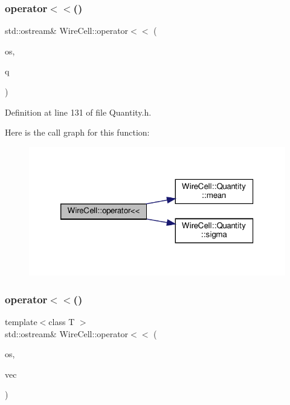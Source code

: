 \subsubsection{\texorpdfstring{operator$<$$<$()}{operator<<()}\hspace{0.1cm}{\footnotesize\ttfamily [5/6]}}
{\footnotesize\ttfamily std\+::ostream\& Wire\+Cell\+::operator$<$$<$ (\begin{DoxyParamCaption}\item[{std\+::ostream \&}]{os,  }\item[{const \hyperlink{class_wire_cell_1_1_quantity}{Wire\+Cell\+::\+Quantity} \&}]{q }\end{DoxyParamCaption})\hspace{0.3cm}{\ttfamily [inline]}}



Definition at line 131 of file Quantity.\+h.

Here is the call graph for this function\+:
\nopagebreak
\begin{figure}[H]
\begin{center}
\leavevmode
\includegraphics[width=320pt]{namespace_wire_cell_a7aeb1994aad6589e9d1da7fc24a4b977_cgraph}
\end{center}
\end{figure}
\mbox{\label{namespace_wire_cell_a041c350d5405d74eac84afa71983b3b8}} 
\subsubsection{\texorpdfstring{operator$<$$<$()}{operator<<()}\hspace{0.1cm}{\footnotesize\ttfamily [6/6]}}
{\footnotesize\ttfamily template$<$class T $>$ \\
std\+::ostream\& Wire\+Cell\+::operator$<$$<$ (\begin{DoxyParamCaption}\item[{std\+::ostream \&}]{os,  }\item[{const \hyperlink{class_wire_cell_1_1_d3_vector}{D3\+Vector}$<$ T $>$ \&}]{vec }\end{DoxyParamCaption})}



